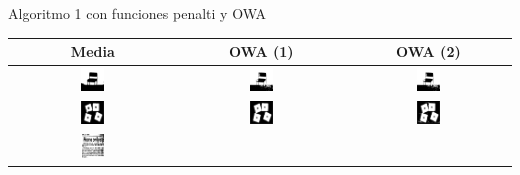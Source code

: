 \documentclass{beamer}
\theoremstyle{plain} %
\theoremstyle{definition}
\newcommand{\bb}{\bfseries}
\begin{document}
\begin{frame}{Algoritmo 1 con funciones penalti y OWA}
  \begin{table}
  \centering
  \begin{tabular}{c|c|c}
  \bb Media&\bb OWA (1)&\bb OWA (2)\\\hline\hline
  \includegraphics[width=0.15\textwidth]{img/res/e6/alg1agregadoowa1chair.jpg} &
  \includegraphics[width=0.15\textwidth]{img/res/e6/alg1agregadoowa2chair.jpg} &
  \includegraphics[width=0.15\textwidth]{img/res/e6/alg1agregadoowa3chair.jpg} \\\hline
  \includegraphics[width=0.15\textwidth]{img/res/e6/alg1agregadoowa1block.jpg} &
  \includegraphics[width=0.15\textwidth]{img/res/e6/alg1agregadoowa2block.jpg} &
  \includegraphics[width=0.15\textwidth]{img/res/e6/alg1agregadoowa3block.jpg} \\\hline
  \includegraphics[width=0.15\textwidth]{img/res/e6/alg1agregadoowa109.jpg} &

\end{tabular}
\end{table}
\end{frame}
\end{document}
